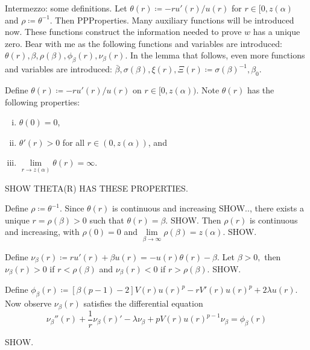 {\color{gray} Intermezzo: some definitions. Let $\theta(r)\coloneqq-ru'(r)/u(r)$ for $r\in[0,z(\alpha)$ and $\rho\coloneqq\theta^{-1}$. Then PPProperties. Many auxiliary functions will be introduced now. These functions construct the information needed to prove $w$ has a unique zero. Bear with me as the following functions and variables are introduced: $\theta(r),\beta,\rho(\beta),\phi_{\beta}(r),\nu_{\beta}(r)$. In the lemma that follows, even more functions and variables are introduced: $\bar\beta,\sigma(\beta),\xi(r), \Xi(r)\coloneqq\sigma(\beta)^{-1},\beta_0$.}

{\color{teal}Define $\theta(r)\coloneqq-ru'(r)/u(r)$ on $r\in[0,z(\alpha))$. Note $\theta(r)$ has the following properties: \begin{enumerate}[(i)]\item $\theta(0)=0$, \item $\theta'(r)>0$ for all $r\in(0,z(\alpha))$, and \item $\underset{r\to z(\alpha)}{\lim}\theta(r)=\infty$. \end{enumerate} SHOW THETA(R) HAS THESE PROPERTIES.

Define $\rho\coloneqq\theta^{-1}$. Since $\theta(r)$ is continuous and increasing SHOW.., there exists a unique $r=\rho(\beta)>0$ such that $\theta(r)=\beta$. SHOW. Then $\rho(r)$ is continuous and increasing, with $\rho(0)=0$ and $\underset{\beta\to\infty}{\lim}\rho(\beta)=z(\alpha).$ SHOW.

Define $\nu_{\beta}(r)\coloneqq ru'(r)+\beta u(r)=-u(r){\theta(r)-\beta}.$ Let $\beta>0,$ then $\nu_{\beta}(r)>0$ if $r<\rho(\beta)$ and $\nu_{\beta}(r)<0$ if $r>\rho(\beta)$. SHOW.

Define $\phi_{\beta}(r)\coloneqq\left[\beta(p-1)-2\right]V(r)u(r)^p-rV'(r)u(r)^p+2\lambda u(r).$ Now observe $\nu_{\beta}(r)$ satisfies the differential equation $$\nu_{\beta}''(r)+\frac{1}{r}\nu_{\beta}(r)'-\lambda\nu_{\beta}+pV(r)u(r)^{p-1}\nu_{\beta}=\phi_{\beta}(r)$$} SHOW.

